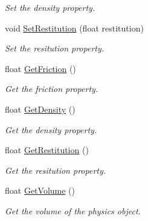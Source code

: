 \begin{DoxyCompactItemize}
\begin{DoxyCompactList}\small\item\em Set the density property. \end{DoxyCompactList}\item 
void \hyperlink{classTarbora_1_1RigidBody_a60ba7ea96ffada37237ce4345b58eb23}{Set\+Restitution} (float restitution)
\begin{DoxyCompactList}\small\item\em Set the resitution property. \end{DoxyCompactList}\item 
\mbox{\label{classTarbora_1_1RigidBody_aaafbb1c80dc9c4dc13e1dc3e3db08f6e}} 
float \hyperlink{classTarbora_1_1RigidBody_aaafbb1c80dc9c4dc13e1dc3e3db08f6e}{Get\+Friction} ()
\begin{DoxyCompactList}\small\item\em Get the friction property. \end{DoxyCompactList}\item 
\mbox{\label{classTarbora_1_1RigidBody_a8bf56fa1c8bc30bd8e7950f879e5b441}} 
float \hyperlink{classTarbora_1_1RigidBody_a8bf56fa1c8bc30bd8e7950f879e5b441}{Get\+Density} ()
\begin{DoxyCompactList}\small\item\em Get the density property. \end{DoxyCompactList}\item 
\mbox{\label{classTarbora_1_1RigidBody_ae48e75c37f24d9bc8023c68fc8b93fc9}} 
float \hyperlink{classTarbora_1_1RigidBody_ae48e75c37f24d9bc8023c68fc8b93fc9}{Get\+Restitution} ()
\begin{DoxyCompactList}\small\item\em Get the resitution property. \end{DoxyCompactList}\item 
float \hyperlink{classTarbora_1_1RigidBody_a04d55e1752e8b1c31a08b460d971ec09}{Get\+Volume} ()
\begin{DoxyCompactList}\small\item\em Get the volume of the physics object. \end{DoxyCompactList}\item 
\mbox{\label{classTarbora_1_1RigidBody_ad3bd01b11639862744797e2bb9c3fca0}} 

\end{DoxyCompactItemize}
